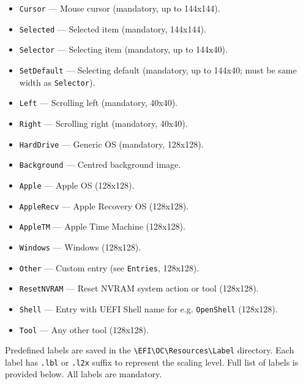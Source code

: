 \documentclass[]{article}
\providecommand{\tightlist}{%
  \setlength{\itemsep}{0pt}\setlength{\parskip}{0pt}}
\begin{document}
\begin{itemize}
\tightlist
  \item \texttt{Cursor} --- Mouse cursor (mandatory, up to 144x144).
  \item \texttt{Selected} --- Selected item (mandatory, 144x144).
  \item \texttt{Selector} --- Selecting item (mandatory, up to 144x40).
  \item \texttt{SetDefault} --- Selecting default (mandatory, up to 144x40; must be same width as \texttt{Selector}).
  \item \texttt{Left} --- Scrolling left (mandatory, 40x40).
  \item \texttt{Right} --- Scrolling right (mandatory, 40x40).
  \item \texttt{HardDrive} --- Generic OS (mandatory, 128x128).
  \item \texttt{Background} --- Centred background image.
  \item \texttt{Apple} --- Apple OS (128x128).
  \item \texttt{AppleRecv} --- Apple Recovery OS (128x128).
  \item \texttt{AppleTM} --- Apple Time Machine (128x128).
  \item \texttt{Windows} --- Windows (128x128).
  \item \texttt{Other} --- Custom entry (see \texttt{Entries}, 128x128).
  \item \texttt{ResetNVRAM} --- Reset NVRAM system action or tool (128x128).
  \item \texttt{Shell} --- Entry with UEFI Shell name for e.g. \texttt{OpenShell} (128x128).
  \item \texttt{Tool} --- Any other tool (128x128).
\end{itemize}

Predefined labels are saved in the
\texttt{\textbackslash EFI\textbackslash OC\textbackslash Resources\textbackslash Label}
directory. Each label has \texttt{.lbl} or \texttt{.l2x} suffix to represent the scaling level.
Full list of labels is provided below. All labels are mandatory.
\end{document}
